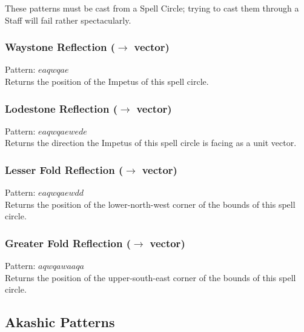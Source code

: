 \documentclass[12pt]{article}
\begin{document}
  
    These patterns must be cast from a Spell Circle; trying to cast them through a Staff will fail rather spectacularly.\\


  \label{sec: patterns/circle@hexcasting:circle/impetus_pos}
\subsubsection*{Waystone Reflection ($\rightarrow$ vector)}

    Pattern: $eaqwqae$\\
      Returns the position of the Impetus of this spell circle.\\


  \label{sec: patterns/circle@hexcasting:circle/impetus_dir}
\subsubsection*{Lodestone Reflection ($\rightarrow$ vector)}

    Pattern: $eaqwqaewede$\\
      Returns the direction the Impetus of this spell circle is facing as a unit vector.\\


  \label{sec: patterns/circle@hexcasting:circle/bounds/min}
\subsubsection*{Lesser Fold Reflection ($\rightarrow$ vector)}

    Pattern: $eaqwqaewdd$\\
      Returns the position of the lower-north-west corner of the bounds of this spell circle.\\


  \label{sec: patterns/circle@hexcasting:circle/bounds/max}
\subsubsection*{Greater Fold Reflection ($\rightarrow$ vector)}

    Pattern: $aqwqawaaqa$\\
      Returns the position of the upper-south-east corner of the bounds of this spell circle.\\

\newpage

\label{sec:patterns/akashic_patterns}
\subsection*{Akashic Patterns}
\end{document}
